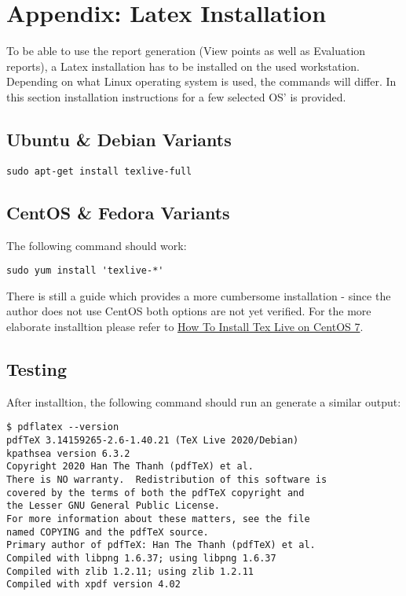  \section{Appendix: Latex Installation}
\label{sec:appendix_latex}  

To be able to use the report generation (View points as well as Evaluation reports), a Latex installation has to be installed on the used workstation. \\

Depending on what Linux operating system is used, the commands will differ. In this section installation instructions for a few selected OS' is provided.

\subsection {Ubuntu \& Debian Variants}

\begin{lstlisting}
sudo apt-get install texlive-full 
\end{lstlisting}

\subsection {CentOS \& Fedora Variants}

The following command should work:

\begin{lstlisting}
sudo yum install 'texlive-*'
\end{lstlisting}

There is still a guide which provides a more cumbersome installation - since the author does not use CentOS both options are not yet verified. For the more elaborate installtion please refer to \href{https://www.systutorials.com/how-to-install-tex-live-on-centos-7-linux/}{How To Install Tex Live on CentOS 7}.

\subsection{Testing}

After installtion, the following command should run an generate a similar output:

\begin{lstlisting}
$ pdflatex --version
pdfTeX 3.14159265-2.6-1.40.21 (TeX Live 2020/Debian)
kpathsea version 6.3.2
Copyright 2020 Han The Thanh (pdfTeX) et al.
There is NO warranty.  Redistribution of this software is
covered by the terms of both the pdfTeX copyright and
the Lesser GNU General Public License.
For more information about these matters, see the file
named COPYING and the pdfTeX source.
Primary author of pdfTeX: Han The Thanh (pdfTeX) et al.
Compiled with libpng 1.6.37; using libpng 1.6.37
Compiled with zlib 1.2.11; using zlib 1.2.11
Compiled with xpdf version 4.02
\end{lstlisting}

